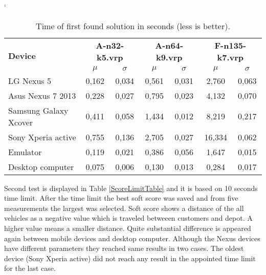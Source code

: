 \begin{table}[h!]
    \catcode`
    \begin{tabular}{|l|c|c|c|c|c|c|}
        \hline
        \multirow{2}{*}{\textbf{Device}} &
        \multicolumn{2}{c|}{\textbf{A-n32-k5.vrp}} &
        \multicolumn{2}{c|}{\textbf{A-n64-k9.vrp}} &
        \multicolumn{2}{c|}{\textbf{F-n135-k7.vrp}} \\ \cline{2-7}
        & $\mu$ & $\sigma$ & $\mu$ & $\sigma$ & $\mu$ & $\sigma$ \\ \hline \hline
        LG Nexus 5            & 0,162 & 0,034 & 0,561 & 0,031 & 2,760  & 0,063 \\ \hline
        Asus Nexus 7 2013     & 0,228 & 0,027 & 0,795 & 0,023 & 4,132  & 0,070 \\ \hline
        Samsung Galaxy Xcover & 0,411 & 0,058 & 1,434 & 0,012 & 8,219  & 0,217 \\ \hline
        Sony Xperia active    & 0,755 & 0,136 & 2,705 & 0,027 & 16,334 & 0,062 \\ \hline
        Emulator              & 0,119 & 0,021 & 0,386 & 0,056 & 1,647  & 0,015 \\ \hline
        Desktop computer      & 0,075 & 0,006 & 0,130 & 0,013 & 0,284  & 0,017 \\ \hline
    \end{tabular}
    \centering
    \caption{Time of first found solution in seconds (less is better).}
    \label{FirstFoundTable}
\end{table}

Second test is displayed in Table \ref{ScoreLimitTable} and it is based on 10 seconds time limit. After the time limit
the best soft score was saved and from five measurements the largest was selected. Soft score shows a distance of the
all vehicles as a negative value which is traveled betweeen customers and depot. A higher value means a smaller
distance. Quite substantial difference is appeared again between mobile devices and desktop computer. Although the Nexus
devices have different parameters they reached same results in two cases. The oldest device (Sony Xperia active) did not
reach any result in the appointed time limit for the last case.


